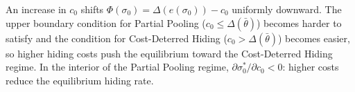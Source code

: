 \label{prop:c0}
An increase in $c_0$ shifts $\Phi(\sigma_0) = \Delta(e(\sigma_0)) - c_0$ uniformly downward. The upper boundary condition for Partial Pooling ($c_0 \leq \Delta(\bar{\theta})$) becomes harder to satisfy and the condition for Cost-Deterred Hiding ($c_0 > \Delta(\bar{\theta})$) becomes easier, so higher hiding costs push the equilibrium toward the Cost-Deterred Hiding regime. In the interior of the Partial Pooling regime, $\partial\sigma_0^*/\partial c_0 < 0$: higher costs reduce the equilibrium hiding rate.
